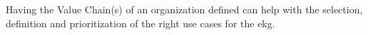 %
%
Having the Value Chain(s) of an organization defined can help with the selection, definition and prioritization of
the right use cases for the \gls{ekg}.


